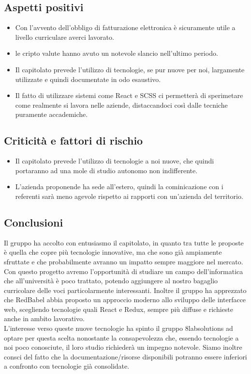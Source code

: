 \subsection{Aspetti positivi}
\begin{itemize}
	\item Con l'avvento dell'obbligo di fatturazione elettronica è sicuramente
	utile a livello curriculare averci lavorato.
	\item le cripto valute hanno avuto un notevole slancio nell'ultimo periodo.
	\item Il capitolato prevede l'utilizzo di tecnologie, se pur nuove per noi,
	largamente utilizzate e quindi documentate in odo esaustivo.
	\item Il fatto di utilizzare sistemi come React e SCSS ci permetterà di
	sperimetare come realmente si lavora nelle aziende, distaccandoci così dalle
	tecniche puramente accademiche.
\end{itemize}

\subsection{Criticità e fattori di rischio}
\begin{itemize}
	\item Il capitolato prevede l'utilizzo di tecnologie a noi nuove, che quindi 
portaranno ad una mole di studio autonomo non indifferente.
	\item L'azienda proponende ha sede all'estero, quindi la cominicazione con i 
referenti sarà meno agevole rispetto ai rapporti con un'azienda del territorio.
\end{itemize}

\subsection{Conclusioni} Il gruppo ha accolto con entusiasmo il capitolato, in 
quanto tra tutte le proposte è quella che copre più tecnologie innovative, ma 
che sono già ampiamente sfruttate e che probabilmente avranno un impatto sempre 
maggiore nel mercato. Con questo progetto avremo l'opportunità di studiare un 
campo dell'informatica che all'università è poco trattato, potendo aggiungere al 
nostro bagaglio curricolare delle voci particolarmente interessanti. Inoltre il 
gruppo ha apprezzato che RedBabel abbia proposto un approccio moderno allo 
sviluppo delle interfacce web, scegliendo tecnologie quali React e Redux, sempre 
più diffuse e richieste anche in ambito lavorativo.\\
 L'interesse verso queste nuove tecnologie ha spinto il gruppo 8labsolutions ad 
optare per questa scelta nonostante la consapevolezza che, essendo tecnologie a 
noi poco conosciute, il loro studio richiederà un impegno notevole. Siamo 
inoltre consci del fatto che la documentazione/risorse disponibili potranno 
essere inferiori a confronto con tecnologie già consolidate.
